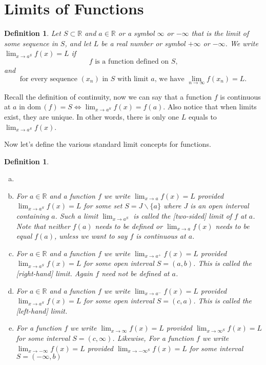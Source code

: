 \documentclass[12pt, lettersize]{book}
\newtheorem{dfn}[thm]{Definition}
\newcommand{\R}{\mathbb{R}}
\newcommand{\dom}{\text{dom}\,}
\begin{document}
	\section{Limits of Functions}
	\begin{dfn}
		Let $S\subset\R$ and $a\in\R$ or a symbol $\infty$ or $-\infty$ that is the limit of some sequence in $S$, and let $L$ be a real number or symbol $+\infty$ or $-\infty$. We write $\lim_{x\rightarrow a^S} f(x)=L$ if
		\begin{displaymath}
			\text{$f$ is a function defined on $S$,}
		\end{displaymath}
		and
		\begin{displaymath}
			\text{for every sequence $(x_n)$ in $S$ with limit $a$, we have $\lim_{n\rightarrow\infty}f(x_n)=L$}.
		\end{displaymath}
	\end{dfn}
	Recall the definition of continuity, now we can say that a function $f$ is continuous at $a$ in $\dom(f)=S \iff \lim_{x\rightarrow a^S} f(x)=f(a)$. Also notice that when limits exist, they are unique. In other words, there
	is only one $L$ equals to $\lim_{x\rightarrow a^S} f(x)$.  
	
	Now let's define the various standard limit concepts for functions.
	\begin{dfn}
		\begin{enumerate}[(a)]
			\item[]
			\item For $a\in\R$ and a function $f$ we write $\lim_{x\rightarrow a}f(x)=L$ provided $\lim_{x\rightarrow a^S}f(x)=L$ for some set $S=J\backslash\{a\}$ where $J$ is an open interval containing $a$. Such a limit 
			$\lim_{x\rightarrow a^S}$ is called the \emph{[two-sided]} limit of $f$ at $a$. Note that neither $f(a)$ needs to be defined or $\lim_{x\rightarrow a}f(x)$ needs to be equal $f(a)$, unless we want to say $f$ is continuous at $a$.
			\item For $a\in\R$ and a function $f$ we write $\lim_{x\rightarrow a^+}f(x)=L$ provided $\lim_{x\rightarrow a^S}f(x)=L$ for some open interval $S=(a,b)$. This is called the \emph{[right-hand]} limit. Again $f$ need not
			be defined at $a$.
			\item For $a\in\R$ and a function $f$ we write $\lim_{x\rightarrow a^-}f(x)=L$ provided $\lim_{x\rightarrow a^S}f(x)=L$ for some open interval $S=(c,a)$. This is called the \emph{[left-hand]} limit.
			\item For a function $f$ we write $\lim_{x\rightarrow\infty}f(x)=L$ provided $\lim_{x\rightarrow\infty^S}f(x)=L$ for some interval $S=(c,\infty)$. Likewise, For a function $f$ we write $\lim_{x\rightarrow-\infty}f(x)=L$ provided $\lim_{x\rightarrow-\infty^S}f(x)=L$ for some interval $S=(-\infty,b)$
		\end{enumerate} 
	\end{dfn}
	
\end{document}
